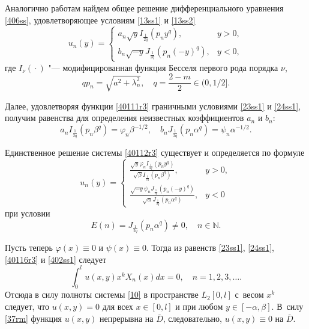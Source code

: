 Аналогично работам \cite{safina:Skb5, safina:SafDu} найдем общее
решение дифференциального уравнения \eqref{406ss}, удовлетворяющее условиям \eqref{13ss1} и \eqref{13ss2}
\begin{equation}
\label{40111r3}
 u_{n}(y)= \left\{
\begin{array}{ll}
a_{n}\sqrt{y}I_{\frac{1}{2q}}(p_{n}y^{q}), & y>0,\\
b_{n}\sqrt{-y}J_{\frac{1}{2q}}(p_{n}(-y)^{q}), & y<0,
\end{array}
\right.
\end{equation}
где  $I_{\nu}({}\cdot{})$ "--- модифицированная функция Бесселя  первого  рода порядка
$\nu$, 
$$qp_{n}=\sqrt{a^{2}+\lambda_{n}^{2}},\quad q=\frac{2-m}{2}\in \bigl(0, 1/ 2\bigr].$$

Далее,  удовлетворяя функции \eqref{40111r3} граничными условиями \eqref{23ss1} и \eqref{24ss1}, получим равенства для определения неизвестных коэффициентов $a_{n}$ и $b_{n}$:
\begin{equation}
\label{40112r3}
a_{n}I_{\frac{1}{2q}}(p_{n}\beta^{q})=\varphi_{n}\beta^{-{1}/{2}}, \quad 
b_{n}J_{\frac{1}{2q}}(p_{n}\alpha^{q})=\psi_{n}\alpha^{-{1}/{2}}.
\end{equation}

Единственное решение системы \eqref{40112r3}  существует и определяется по формуле
\begin{equation}
\label{40116r3}
 u_{n}(y)= \left\{
\begin{array}{ll}
\displaystyle  \frac{\sqrt{y}\varphi_{n}I_{\frac{1}{2q}}(p_{n}y^{q})}{\sqrt{\beta}I_{\frac{1}{2q}}(p_{n}\beta^{q})}, & y>0,\\[3mm]
\displaystyle  
\frac{\sqrt{-y}\psi_{n}J_{\frac{1}{2q}}(p_{n}(-y)^{q})}{\sqrt{\alpha}J_{\frac{1}{2q}}(p_{n}\alpha^{q})}, &
y<0
\end{array}
\right.
\end{equation}
при условии
\begin{equation}
\label{40113r3} E(n)=J_{\frac{1}{2q}}(p_{n}\alpha^{q})\neq 0, \quad   n\in \mathbb{N}.
\end{equation}


Пусть теперь $\varphi(x)\equiv 0$ и $\psi(x)\equiv 0$. 
Тогда из равенств \eqref{23ss1}, \eqref{24ss1}, \eqref{40116r3}  и \eqref{402ss1} следует
\begin{equation*}
 \int _{0}^{l}u(x,y)x^{k}X_{n}(x)dx=0, \quad  n=1, 2, 3, \dots .
\end{equation*}
Отсюда в силу полноты системы \eqref{10} в пространстве $L_{2}[0,l]$ с~весом $x^{k}$ следует, что $u(x,y)=0$ для всех $x\in [0,l]$ и при любом $y\in [-\alpha,\beta]$. 
В~силу \eqref{37rm} функция $u(x,y)$ непрерывна на $\overline{D}$, следовательно, $u(x,y)\equiv 0$ на
$\overline{D}$.



